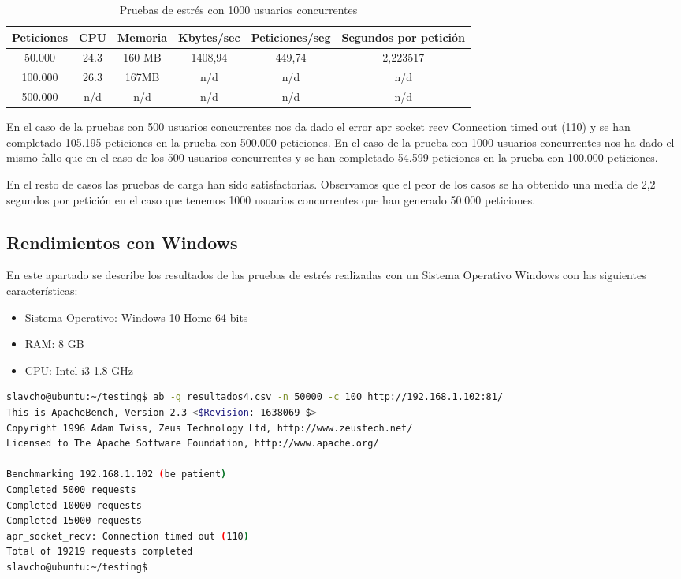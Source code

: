 \begin{table}[H]
	\begin{center}
		\begin{tabular}{|c|c|c|c|c|c|} \hline
			Peticiones & CPU & Memoria & Kbytes/sec & Peticiones/seg & Segundos por petición \\ \hline
			50.000 & 24.3 & 160 MB & 1408,94 & 449,74 & 2,223517 \\ \hline
			100.000 & 26.3 & 167MB & n/d & n/d & n/d \\ \hline
			500.000 & n/d & n/d & n/d & n/d & n/d \\ \hline
		\end{tabular}
		\caption{Pruebas de estrés con 1000 usuarios concurrentes}
		\label{tabla:MilUsuarios}
	\end{center}
\end{table}

En el caso de la pruebas con 500 usuarios concurrentes nos da dado el error apr socket recv Connection timed out (110) y se han completado 105.195 peticiones en la prueba con 500.000 peticiones. En el caso de la prueba con 1000 usuarios concurrentes nos ha dado el mismo fallo que en el caso de los 500 usuarios concurrentes y se han completado 54.599 peticiones en la prueba con 100.000 peticiones. 

En el resto de casos las pruebas de carga han sido satisfactorias. Observamos que el peor de los casos se ha obtenido una media de 2,2 segundos por petición en el caso que tenemos 1000 usuarios concurrentes que han generado 50.000 peticiones.

\subsection{Rendimientos con Windows}

En este apartado se describe los resultados de las pruebas de estrés realizadas con un Sistema Operativo Windows con las siguientes características:

\begin{itemize}
	\item Sistema Operativo: Windows 10 Home 64 bits
	\item RAM: 8 GB
	\item CPU: Intel i3 1.8 GHz
\end{itemize}

\begin{lstlisting}[language=bash]
slavcho@ubuntu:~/testing$ ab -g resultados4.csv -n 50000 -c 100 http://192.168.1.102:81/
This is ApacheBench, Version 2.3 <$Revision: 1638069 $>
Copyright 1996 Adam Twiss, Zeus Technology Ltd, http://www.zeustech.net/
Licensed to The Apache Software Foundation, http://www.apache.org/

Benchmarking 192.168.1.102 (be patient)
Completed 5000 requests
Completed 10000 requests
Completed 15000 requests
apr_socket_recv: Connection timed out (110)
Total of 19219 requests completed
slavcho@ubuntu:~/testing$
\end{lstlisting}

